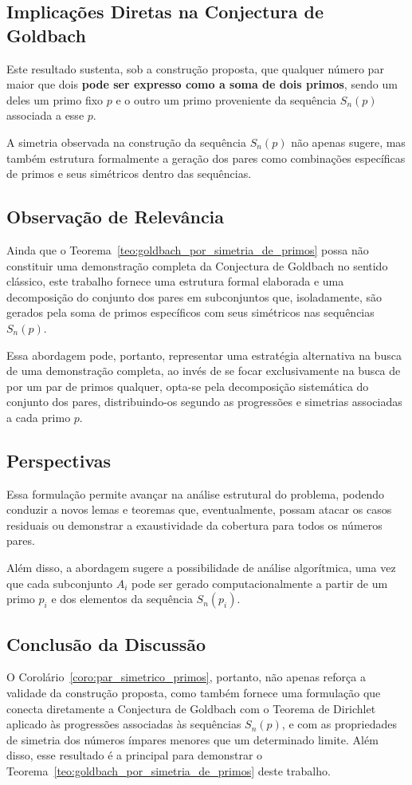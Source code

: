 \documentclass[a4paper,11pt]{article}
\theoremstyle{definition}
\theoremstyle{remark}
\begin{document}
\begin{otherlanguage}{brazil}
	\subsection{Implicações Diretas na Conjectura de Goldbach}
	Este resultado sustenta, sob a construção proposta, que qualquer número par maior que dois \textbf{pode ser expresso como a soma de dois primos}, sendo um deles um primo fixo \(p\) e o outro um primo proveniente da sequência \(S_n(p)\) associada a esse \(p\).
	
	A simetria observada na construção da sequência \(S_n(p)\) não apenas sugere, mas também estrutura formalmente a geração dos pares como combinações específicas de primos e seus simétricos dentro das sequências.
	
	\subsection{Observação de Relevância}
	Ainda que o Teorema~\ref{teo:goldbach_por_simetria_de_primos} possa não constituir uma demonstração completa da Conjectura de Goldbach no sentido clássico, este trabalho fornece uma estrutura formal elaborada e uma decomposição do conjunto dos pares em subconjuntos que, isoladamente, são gerados pela soma de primos específicos com seus simétricos nas sequências \(S_n(p)\).
	
	Essa abordagem pode, portanto, representar uma estratégia alternativa na busca de uma demonstração completa, ao invés de se focar exclusivamente na busca de por um par de primos qualquer, opta-se pela decomposição sistemática do conjunto dos pares, distribuindo-os segundo as progressões e simetrias associadas a cada primo \(p\).
	
	\subsection{Perspectivas}
	Essa formulação permite avançar na análise estrutural do problema, podendo conduzir a novos lemas e teoremas que, eventualmente, possam atacar os casos residuais ou demonstrar a exaustividade da cobertura para todos os números pares.
	
	Além disso, a abordagem sugere a possibilidade de análise algorítmica, uma vez que cada subconjunto \(A_i\) pode ser gerado computacionalmente a partir de um primo \(p_i\) e dos elementos da sequência \(S_n(p_i)\).
	
	\subsection{Conclusão da Discussão}
	O Corolário~\ref{coro:par_simetrico_primos}, portanto, não apenas reforça a validade da construção proposta, como também fornece uma formulação que conecta diretamente a Conjectura de Goldbach com o Teorema de Dirichlet aplicado às progressões associadas às sequências \(S_n(p)\), e com as propriedades de simetria dos números ímpares menores que um determinado limite. Além disso, esse resultado é a principal para demonstrar o Teorema~\ref{teo:goldbach_por_simetria_de_primos} deste trabalho.
	

\end{otherlanguage}
\end{document}
